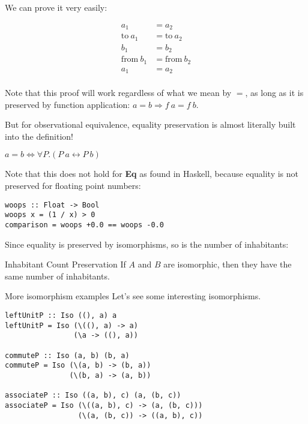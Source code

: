 \documentclass[tikz]{beamer}
\theoremstyle{definition}
\begin{document}
\begin{frame}[fragile]
We can prove it very easily:

\begin{align*}
    a_1 &= a_2 \\ 
    \text{to}~a_1 &= \text{to}~a_2 \\
    b_1 &= b_2 \\
    \text{from}~b_1 &= \text{from}~b_2 \\
    a_1 &= a_2 \\
\end{align*}

Note that this proof will work regardless of what we mean by $=$, as long as it is preserved by function application: $a = b \Rightarrow f~a = f~b$.
\end{frame}

\begin{frame}[fragile]
But for observational equivalence, equality preservation is almost literally built into the definition!

\begin{center}
    $a = b \iff \forall P. (P~a \leftrightarrow P~b)$
\end{center}
\end{frame}


\begin{frame}[fragile]
Note that this does not hold for \textbf{Eq} as found in Haskell, because equality is not preserved for floating point numbers:
\begin{verbatim}
woops :: Float -> Bool
woops x = (1 / x) > 0
comparison = woops +0.0 == woops -0.0
\end{verbatim}
\end{frame}


\begin{frame}[fragile]
Since equality is preserved by isomorphisms, so is the number of inhabitants:

\begin{block}{Inhabitant Count Preservation}
If $A$ and $B$ are isomorphic, then they have the same number of inhabitants.
\end{block}
\end{frame}

\begin{frame}[fragile]{More isomorphism examples}
Let's see some interesting isomorphisms.
    
\begin{verbatim}
leftUnitP :: Iso ((), a) a
leftUnitP = Iso (\((), a) -> a)
                (\a -> ((), a))

commuteP :: Iso (a, b) (b, a)
commuteP = Iso (\(a, b) -> (b, a))
               (\(b, a) -> (a, b))
              
associateP :: Iso ((a, b), c) (a, (b, c))
associateP = Iso (\((a, b), c) -> (a, (b, c)))
                 (\(a, (b, c)) -> ((a, b), c))
\end{verbatim}
\end{frame}
\end{document}
